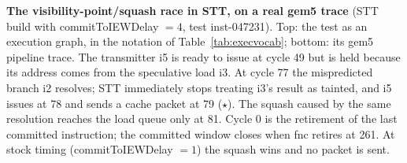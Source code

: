 \textbf{The visibility-point/squash race in STT, on a real gem5 trace} (STT build with commitToIEWDelay $=4$, test inst-047231). Top: the test as an execution graph, in the notation of Table~\ref{tab:execvocab}; bottom: its gem5 pipeline trace. The transmitter i5 is ready to issue at cycle 49 but is held because its address comes from the speculative load i3. At cycle 77 the mispredicted branch i2 resolves; STT immediately stops treating i3's result as tainted, and i5 issues at 78 and sends a cache packet at 79 ($\star$). The squash caused by the same resolution reaches the load queue only at 81. Cycle 0 is the retirement of the last committed instruction; the committed window closes when fnc retires at 261. At stock timing (commitToIEWDelay $=1$) the squash wins and no packet is sent.
